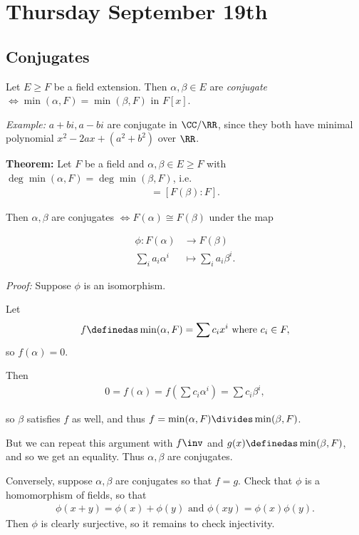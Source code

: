 \hypertarget{thursday-september-19th}{%
\section{Thursday September 19th}\label{thursday-september-19th}}

\hypertarget{conjugates}{%
\subsection{Conjugates}\label{conjugates}}

Let \(E \geq F\) be a field extension. Then \(\alpha,\beta \in E\) are
\emph{conjugate} \(\iff \min(\alpha, F) = \min(\beta, F)\) in \(F[x]\).

\emph{Example:} \(a + bi, a-bi\) are conjugate in \(\CC/\RR\), since
they both have minimal polynomial \(x^2 - 2ax + (a^2 + b^2)\) over
\(\RR\).

\textbf{Theorem:} Let \(F\) be a field and
\(\alpha, \beta \in E \geq F\) with
\(\deg \min (\alpha, F) = \deg \min(\beta, F)\), i.e.
\begin{align*}
[F(\alpha): F] = [F(\beta): F]
.\end{align*}

Then \(\alpha, \beta\) are conjugates \(\iff F(\alpha) \cong F(\beta)\)
under the map

\begin{align*}
\phi: F(\alpha) &\to F(\beta)\\
\sum_i a_i \alpha^i &\mapsto \sum_i a_i \beta^i
.\end{align*}

\emph{Proof:} Suppose \(\phi\) is an isomorphism.

Let
\begin{align*}
f \definedas \min (\alpha, F) = \sum c_i x^i
\text{ where }
c_i \in F
,\end{align*} so \(f(\alpha) = 0\).

Then \begin{align*}
0 = f(\alpha) = f(\sum c_i \alpha^i) = \sum c_i \beta^i
,\end{align*}

so \(\beta\) satisfies \(f\) as well, and thus
\(f = \min(\alpha, F) \divides \min(\beta, F)\).

But we can repeat this argument with \(f\inv\) and
\(g(x) \definedas \min(\beta, F)\), and so we get an equality. Thus
\(\alpha, \beta\) are conjugates.

Conversely, suppose \(\alpha, \beta\) are conjugates so that \(f = g\).
Check that \(\phi\) is a homomorphism of fields, so that
\begin{align*}
\phi(x + y) = \phi(x) + \phi(y)
\text{ and }
\phi(xy) = \phi(x) \phi(y)
.\end{align*} Then \(\phi\) is clearly surjective, so it remains to
check injectivity.

